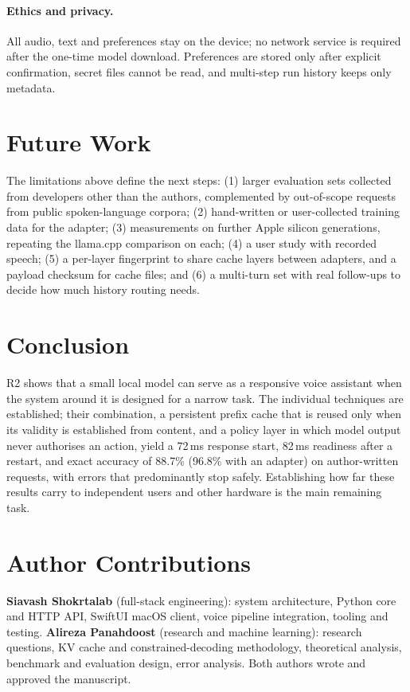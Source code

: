 \documentclass[10pt,twocolumn,letterpaper]{article}
\theoremstyle{definition}
\begin{document}
\paragraph{Ethics and privacy.}
All audio, text and preferences stay on the device; no network service is required after the
one-time model download. Preferences are stored only after explicit confirmation, secret files cannot
be read, and multi-step run history keeps only metadata.

\section{Future Work}

The limitations above define the next steps: (1) larger evaluation sets collected from developers
other than the authors, complemented by out-of-scope requests from public spoken-language corpora;
(2) hand-written or user-collected training data for the adapter; (3) measurements on further Apple
silicon generations, repeating the llama.cpp comparison on each; (4) a user study with recorded speech; (5) a per-layer fingerprint to share cache layers
between adapters, and a payload checksum for cache files; and (6) a multi-turn set with real
follow-ups to decide how much history routing needs.

\section{Conclusion}

R2 shows that a small local model can serve as a responsive voice assistant when the system around
it is designed for a narrow task. The individual techniques are established; their combination, a
persistent prefix cache that is reused only when its validity is established from content, and a
policy layer in which model output never authorises an action, yield a 72\,ms response start,
82\,ms readiness after a restart, and exact accuracy of 88.7\% (96.8\% with an adapter) on
author-written requests, with errors that predominantly stop safely. Establishing how far these
results carry to independent users and other hardware is the main remaining task.

\section*{Author Contributions}
\textbf{Siavash Shokrtalab} (full-stack engineering): system architecture, Python core and
HTTP API, SwiftUI macOS client, voice pipeline integration, tooling and testing.
\textbf{Alireza Panahdoost} (research and machine learning): research questions, KV cache and
constrained-decoding methodology, theoretical analysis, benchmark and evaluation design, error
analysis. Both authors wrote and approved the manuscript.
\end{document}
